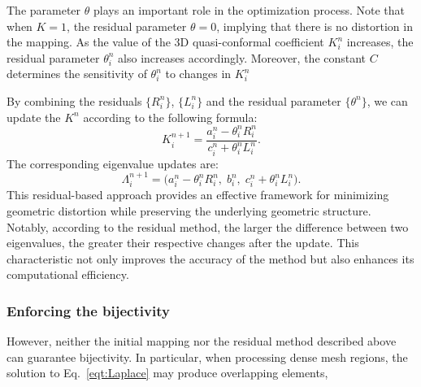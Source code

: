 \documentclass{article}
\begin{document}
The parameter $\theta$ plays an important role in the optimization process. Note that when $K = 1$, the residual parameter $\theta = 0$, implying that there is no distortion in the mapping. As the value of the 3D quasi-conformal coefficient $K^n_i$ increases, the residual parameter $\theta^n_i$ also increases accordingly. Moreover, the constant $C$ determines the sensitivity of $\theta^n_i$ to changes in $K^n_i$


By combining the residuals $\{R^n_i \}$, $\{L^n_i \}$ and the residual parameter $\{\theta^n \}$, we can update the $K^n$ according to the following formula:
\begin{equation}\label{eqt:update_3dqc_coeff}
    K^{n+1}_i = \frac{a^n_i - \theta^n_i R^n_i}{c^n_i + \theta^n_i L^n_i}.
\end{equation}
The corresponding eigenvalue updates are:
\begin{equation}
    \Lambda^{n+1}_i = \big(a^n_i - \theta^n_i R^n_i,\; b^n_i,\; c^n_i + \theta^n_i L^n_i\big).
\end{equation}
This residual-based approach provides an effective framework for minimizing geometric distortion while preserving the underlying geometric structure. Notably, according to the residual method, the larger the difference between two eigenvalues, the greater their respective changes after the update. This characteristic not only improves the accuracy of the method but also enhances its computational efficiency.

\subsubsection{Enforcing the bijectivity}
However, neither the initial mapping nor the residual method described above can guarantee bijectivity. In particular, when processing dense mesh regions, the solution to Eq.~\eqref{eqt:Laplace} may produce overlapping elements,
\end{document}
